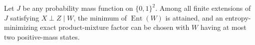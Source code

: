 Let \(J\) be any probability mass function on \(\{0,1\}^2\). Among all finite extensions of \(J\) satisfying \(X\perp Z\mid W\), the minimum of \(\operatorname{Ent}(W)\) is attained, and an entropy-minimizing exact product-mixture factor can be chosen with \(W\) having at most two positive-mass states.